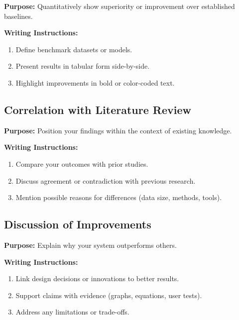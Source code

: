 {\color{blue}\textbf{Purpose:}
Quantitatively show superiority or improvement over established baselines.} \\

{\color{red}\textbf{Writing Instructions:}
\begin{enumerate}
    \item Define benchmark datasets or models.
    
    \item Present results in tabular form side-by-side.
    
    \item Highlight improvements in bold or color-coded text.
\end{enumerate}}

\subsection{Correlation with Literature Review}

{\color{blue}\textbf{Purpose:}
Position your findings within the context of existing knowledge.} \\

{\color{red}\textbf{Writing Instructions:}
\begin{enumerate}
    \item Compare your outcomes with prior studies.
    
    \item Discuss agreement or contradiction with previous research.
    
    \item Mention possible reasons for differences (data size, methods, tools).
\end{enumerate}}

\subsection{Discussion of Improvements}

{\color{blue}\textbf{Purpose:}
Explain why your system outperforms others.} \\

{\color{red}\textbf{Writing Instructions:}
\begin{enumerate}
    \item Link design decisions or innovations to better results.
    
    \item Support claims with evidence (graphs, equations, user tests).
    
    \item Address any limitations or trade-offs.
\end{enumerate}}


